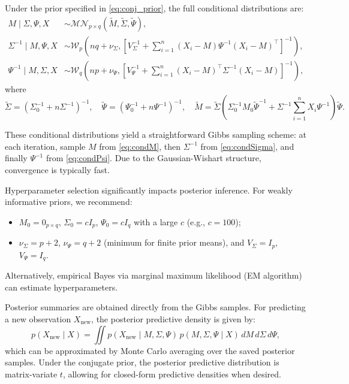 \documentclass[twoside]{article}
\begin{document}
\begin{thm}\label{thm:fullcond}
Under the prior specified in \eqref{eq:conj_prior}, the full conditional distributions are:
\begin{align}
M \mid \Sigma, \Psi, X &\sim \mathcal{MN}_{p \times q}\left( \widetilde{M}, \widetilde{\Sigma}, \widetilde{\Psi} \right), \label{eq:condM}\\
\Sigma^{-1} \mid M, \Psi, X &\sim \mathcal{W}_p\left( nq + \nu_\Sigma, \left[ V_\Sigma^{-1} + \sum_{i=1}^n (X_i - M) \Psi^{-1} (X_i - M)^\top \right]^{-1} \right), \label{eq:condSigma}\\
\Psi^{-1} \mid M, \Sigma, X &\sim \mathcal{W}_q\left( np + \nu_\Psi, \left[ V_\Psi^{-1} + \sum_{i=1}^n (X_i - M)^\top \Sigma^{-1} (X_i - M) \right]^{-1} \right), \label{eq:condPsi}
\end{align}
where 
\begin{equation*}
\widetilde{\Sigma} = \left( \Sigma_0^{-1} + n \Sigma^{-1} \right)^{-1}, \quad 
\widetilde{\Psi} = \left( \Psi_0^{-1} + n \Psi^{-1} \right)^{-1}, \quad 
\widetilde{M} = \widetilde{\Sigma} \left( \Sigma_0^{-1} M_0 \widetilde{\Psi}^{-1} + \Sigma^{-1} \sum_{i=1}^n X_i \Psi^{-1} \right) \widetilde{\Psi}. \nonumber
\end{equation*}
\end{thm}
\noindent These conditional distributions yield a straightforward Gibbs sampling scheme: at each iteration, sample $M$ from \eqref{eq:condM}, then $\Sigma^{-1}$ from \eqref{eq:condSigma}, and finally $\Psi^{-1}$ from \eqref{eq:condPsi}. Due to the Gaussian-Wishart structure, convergence is typically fast.

\noindent  Hyperparameter selection significantly impacts posterior inference. For weakly informative priors, we recommend:
\begin{itemize}
    \item $M_0 = 0_{p \times q}$, $\Sigma_0 = c I_p$, $\Psi_0 = c I_q$ with a large $c$ (e.g., $c = 100$);
    \item $\nu_\Sigma = p+2$, $\nu_\Psi = q+2$ (minimum for finite prior means), and $V_\Sigma = I_p$, $V_\Psi = I_q$.
\end{itemize}
Alternatively, empirical Bayes via marginal maximum likelihood (EM algorithm) can estimate hyperparameters.

Posterior summaries are obtained directly from the Gibbs samples. For predicting a new observation $X_{\text{new}}$, the posterior predictive density is given by:
\begin{equation*}
p(X_{\text{new}} \mid X) = \iint p(X_{\text{new}} \mid M, \Sigma, \Psi) \, p(M, \Sigma, \Psi \mid X) \, dM \, d\Sigma \, d\Psi,
\end{equation*}
which can be approximated by Monte Carlo averaging over the saved posterior samples. Under the conjugate prior, the posterior predictive distribution is matrix-variate $t$, allowing for closed-form predictive densities when desired.
\end{document}
